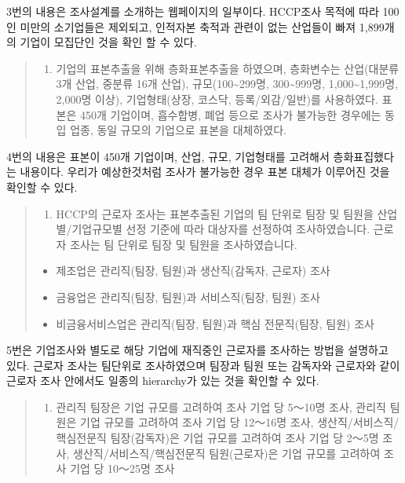 \documentclass[
]{book}
\providecommand{\tightlist}{%
  \setlength{\itemsep}{0pt}\setlength{\parskip}{0pt}}
\begin{document}
3번의 내용은 조사설계를 소개하는 웹페이지의 일부이다. HCCP조사 목적에 따라 100인 미만의 소기업들은 제외되고, 인적자본 축적과 관련이 없는 산업들이 빠져 1,899개의 기업이 모집단인 것을 확인 할 수 있다.

\begin{quote}
\begin{enumerate}
\def\labelenumi{\arabic{enumi}.}
\setcounter{enumi}{3}
\tightlist
\item
  기업의 표본추출을 위해 층화표본추출을 하였으며, 층화변수는 산업(대분류 3개 산업, 중분류 16개 산업), 규모(100\textasciitilde299명, 300\textasciitilde999명, 1,000\textasciitilde1,999명, 2,000명 이상), 기업형태(상장, 코스닥, 등록/외감/일반)를 사용하였다. 표본은 450개 기업이며, 흡수합병, 폐업 등으로 조사가 불가능한 경우에는 동입 업종, 동일 규모의 기업으로 표본을 대체하였다.
\end{enumerate}
\end{quote}

4번의 내용은 표본이 450개 기업이며, 산업, 규모, 기업형태를 고려해서 층화표집했다는 내용이다. 우리가 예상한것처럼 조사가 불가능한 경우 표본 대체가 이루어진 것을 확인할 수 있다.

\begin{quote}
\begin{enumerate}
\def\labelenumi{\arabic{enumi}.}
\setcounter{enumi}{4}
\tightlist
\item
  HCCP의 근로자 조사는 표본추출된 기업의 팀 단위로 팀장 및 팀원을 산업별/기업규모별 선정 기준에 따라 대상자를 선정하여 조사하였습니다. 근로자 조사는 팀 단위로 팀장 및 팀원을 조사하였습니다.
\end{enumerate}

\begin{itemize}
\tightlist
\item
  제조업은 관리직(팀장, 팀원)과 생산직(감독자, 근로자) 조사
\item
  금융업은 관리직(팀장, 팀원)과 서비스직(팀장, 팀원) 조사
\item
  비금융서비스업은 관리직(팀장, 팀원)과 핵심 전문직(팀장, 팀원) 조사
\end{itemize}
\end{quote}

5번은 기업조사와 별도로 해당 기업에 재직중인 근로자를 조사하는 방법을 설명하고 있다. 근로자 조사는 팀단위로 조사하였으며 팀장과 팀원 또는 감독자와 근로자와 같이 근로자 조사 안에서도 일종의 hierarchy가 있는 것을 확인할 수 있다.

\begin{quote}
\begin{enumerate}
\def\labelenumi{\arabic{enumi}.}
\setcounter{enumi}{5}
\tightlist
\item
  관리직 팀장은 기업 규모를 고려하여 조사 기업 당 5～10명 조사, 관리직 팀원은 기업 규모를 고려하여 조사 기업 당 12～16명 조사, 생산직/서비스직/핵심전문직 팀장(감독자)은 기업 규모를 고려하여 조사 기업 당 2～5명 조사, 생산직/서비스직/핵심전문직 팀원(근로자)은 기업 규모를 고려하여 조사 기업 당 10～25명 조사
\end{enumerate}
\end{quote}
\end{document}
